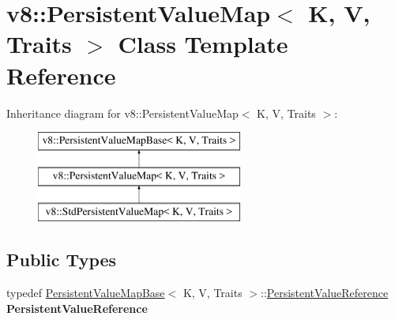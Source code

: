 \hypertarget{classv8_1_1PersistentValueMap}{}\section{v8\+:\+:Persistent\+Value\+Map$<$ K, V, Traits $>$ Class Template Reference}
\label{classv8_1_1PersistentValueMap}
Inheritance diagram for v8\+:\+:Persistent\+Value\+Map$<$ K, V, Traits $>$\+:\begin{figure}[H]
\begin{center}
\leavevmode
\includegraphics[height=3.000000cm]{classv8_1_1PersistentValueMap}
\end{center}
\end{figure}
\subsection*{Public Types}
\begin{DoxyCompactItemize}
\item 
\mbox{\label{classv8_1_1PersistentValueMap_a81ed968e13bcef1cd97a09fd024f30f2}} 
typedef \mbox{\hyperlink{classv8_1_1PersistentValueMapBase}{Persistent\+Value\+Map\+Base}}$<$ K, V, Traits $>$\+::\mbox{\hyperlink{classv8_1_1PersistentValueMapBase_1_1PersistentValueReference}{Persistent\+Value\+Reference}} {\bfseries Persistent\+Value\+Reference}
\end{DoxyCompactItemize}
